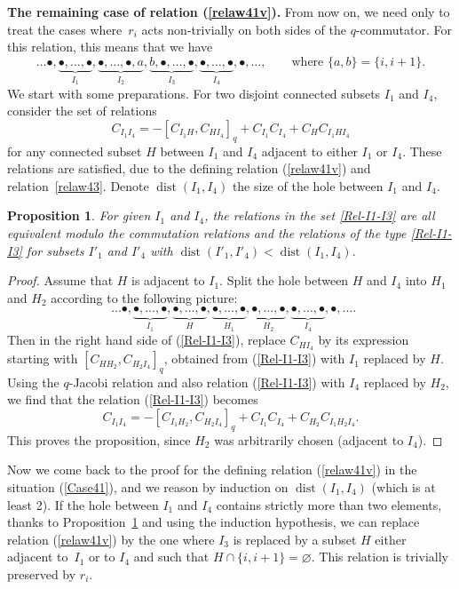\documentclass[10pt,a4paper]{amsart}
\numberwithin{equation}{section}
\newtheorem{prop}[theo]{Proposition}
\theoremstyle{definition}
\begin{document}
{\bf The remaining case of relation (\ref{relaw41v}).} From now on, we need only to treat the cases where~$r_i$ acts non-trivially on both sides of the $q$-commutator. For this relation, this means that we have
\begin{equation}\label{Case41} \ldots \bullet,\underbrace{\bullet,\dots,\bullet}_{I_1},\underbrace{\bullet,\dots,\bullet,a}_{I_2},\underbrace{b,\bullet,\dots,\bullet}_{I_3},\underbrace{\bullet,\dots,\bullet}_{I_4},\bullet,\ldots ,\qquad \text{where $\{a,b\}=\{i,i+1\}$.}\end{equation}
We start with some preparations. For two disjoint connected subsets $I_1$ and $I_4$, consider the set of relations
\begin{equation}\label{Rel-I1-I3}C_{I_1I_4}=-[C_{I_1H},C_{HI_4}]_q+C_{I_1}C_{I_4}+C_{H}C_{I_1HI_4}
\end{equation}
for any connected subset $H$ between $I_1$ and $I_4$ adjacent to either $I_1$ or $I_4$. These relations are satisfied, due to the defining relation (\ref{relaw41v}) and relation~\eqref{relaw43}. Denote $\operatorname{dist}(I_1,I_4)$ the size of the hole between $I_1$ and $I_4$.
\begin{prop}\label{prop-equiv}
For given $I_1$ and $I_4$, the relations in the set \eqref{Rel-I1-I3} are all equivalent modulo the commutation relations and the relations of the type \eqref{Rel-I1-I3} for subsets $I'_1$ and $I'_4$ with $\operatorname{dist}(I'_1,I'_4)<\operatorname{dist}(I_1,I_4)$.
\end{prop}
\begin{proof}
Assume that $H$ is adjacent to $I_1$. Split the hole between $H$ and $I_4$ into $H_1$ and $H_2$ according to the following picture:
\[\ \ \ldots \bullet,\underbrace{\bullet,\dots,\bullet}_{I_1},\underbrace{\bullet,\dots,\bullet}_{H},\underbrace{\bullet,\dots,\bullet}_{H_1},\underbrace{\bullet,\dots,\bullet}_{H_2},\underbrace{\bullet,\dots,\bullet}_{I_4},\bullet,\ldots .\]
Then in the right hand side of (\ref{Rel-I1-I3}), replace $C_{HI_4}$ by its expression starting with $[C_{HH_2},C_{H_2I_4}]_q$, obtained from (\ref{Rel-I1-I3}) with $I_1$ replaced by $H$. Using the $q$-Jacobi relation and also relation (\ref{Rel-I1-I3}) with $I_4$ replaced by $H_2$, we find that the relation (\ref{Rel-I1-I3}) becomes
\[C_{I_1I_4}=-[C_{I_1H_2},C_{H_2I_4}]_q+C_{I_1}C_{I_4}+C_{H_2}C_{I_1H_2I_4} .\]
This proves the proposition, since $H_2$ was arbitrarily chosen (adjacent to $I_4$).
\end{proof}

Now we come back to the proof for the defining relation (\ref{relaw41v}) in the situation (\ref{Case41}), and we reason by induction on $\operatorname{dist}(I_1,I_4)$ (which is at least 2). If the hole between $I_1$ and $I_4$ contains strictly more than two elements, thanks to Proposition~\ref{prop-equiv} and using the induction hypothesis, we can replace relation (\ref{relaw41v}) by the one where $I_3$ is replaced by a subset $H$ either adjacent to~$I_1$ or to $I_4$ and such that $H\cap\{i,i+1\}=\varnothing$. This relation is trivially preserved by $r_i$.
\end{document}
